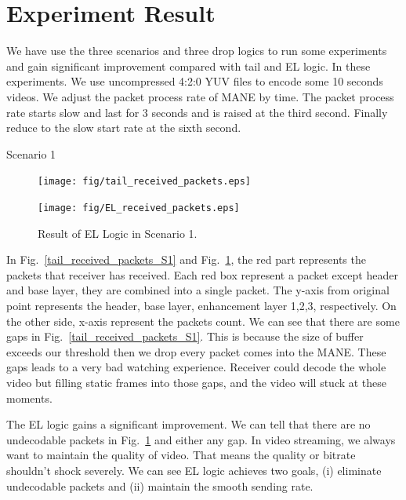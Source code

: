 \section{Experiment Result} \label{sec:result}

We have use the three scenarios and three drop logics to run some experiments and gain significant improvement compared with tail and EL logic. In these experiments. We use uncompressed 4:2:0 YUV files to encode some 10 seconds videos. We adjust the packet process rate of MANE by time. The packet process rate starts slow and last for 3 seconds and is raised at the third second. Finally reduce to the slow start rate at the sixth second. 

\begin{subsection}
    {Scenario 1}

\begin{figure}[tbh]
	\centering
	\begin{minipage}[t]{0.80\textwidth}
	\centering
	\texttt{[image: fig/tail\_received\_packets.eps]}
	\caption{Result of Tail Logic in Scenario 1.}
	\label{tail_received_packets_S1} 
	\end{minipage}
	\hfill\begin{minipage}[t]{0.80\textwidth}
	\centering
	\texttt{[image: fig/EL\_received\_packets.eps]}
	\caption{Result of EL Logic in Scenario 1.}
	\label{EL_received_packets_S1} 
	\end{minipage}
	\vspace{-0.1cm}
\end{figure}


In Fig.~\ref{tail_received_packets_S1} and Fig.~\ref{EL_received_packets_S1}, the red part represents the packets that receiver has received. Each red box represent a packet except header and base layer, they are combined into a single packet. The y-axis from original point represents the header, base layer, enhancement layer 1,2,3, respectively. On the other side, x-axis represent the packets count. We can see that there are some gaps in Fig.~\ref{tail_received_packets_S1}. This is because the size of buffer exceeds our threshold then we drop every packet comes into the MANE. These gaps leads to a very bad watching experience. Receiver could decode the whole video but filling static frames into those gaps, and the video will stuck at these moments.

The EL logic gains a significant improvement. We can tell that there are no undecodable packets in Fig.~\ref{EL_received_packets_S1} and either any gap. In video streaming, we always want to maintain the quality of video. That means the quality or bitrate shouldn't shock severely. We can see EL logic achieves two goals, (i) eliminate undecodable packets and (ii) maintain the smooth sending rate.


\end{subsection}

